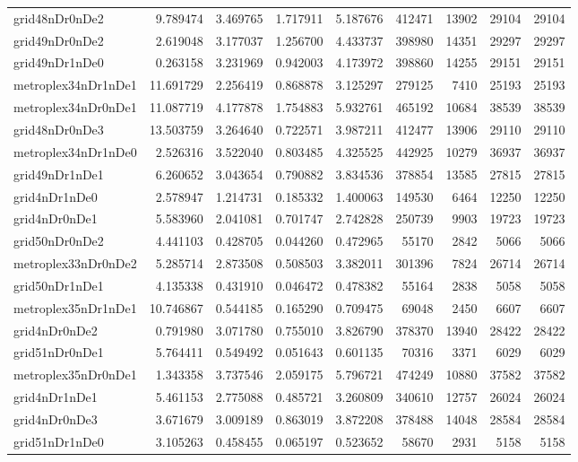\documentclass[../../../thesis.tex]{subfiles}
\begin{document}
\begin{longtable}{|l|r|r|r|r|r|r|r|r|}
grid48nDr0nDe2 & 9.789474 & 3.469765 & 1.717911 & 5.187676 & 412471 & 13902 & 29104 & 29104 \\
grid49nDr0nDe2 & 2.619048 & 3.177037 & 1.256700 & 4.433737 & 398980 & 14351 & 29297 & 29297 \\
grid49nDr1nDe0 & 0.263158 & 3.231969 & 0.942003 & 4.173972 & 398860 & 14255 & 29151 & 29151 \\
metroplex34nDr1nDe1 & 11.691729 & 2.256419 & 0.868878 & 3.125297 & 279125 & 7410 & 25193 & 25193 \\
metroplex34nDr0nDe1 & 11.087719 & 4.177878 & 1.754883 & 5.932761 & 465192 & 10684 & 38539 & 38539 \\
grid48nDr0nDe3 & 13.503759 & 3.264640 & 0.722571 & 3.987211 & 412477 & 13906 & 29110 & 29110 \\
metroplex34nDr1nDe0 & 2.526316 & 3.522040 & 0.803485 & 4.325525 & 442925 & 10279 & 36937 & 36937 \\
grid49nDr1nDe1 & 6.260652 & 3.043654 & 0.790882 & 3.834536 & 378854 & 13585 & 27815 & 27815 \\
grid4nDr1nDe0 & 2.578947 & 1.214731 & 0.185332 & 1.400063 & 149530 & 6464 & 12250 & 12250 \\
grid4nDr0nDe1 & 5.583960 & 2.041081 & 0.701747 & 2.742828 & 250739 & 9903 & 19723 & 19723 \\
grid50nDr0nDe2 & 4.441103 & 0.428705 & 0.044260 & 0.472965 & 55170 & 2842 & 5066 & 5066 \\
metroplex33nDr0nDe2 & 5.285714 & 2.873508 & 0.508503 & 3.382011 & 301396 & 7824 & 26714 & 26714 \\
grid50nDr1nDe1 & 4.135338 & 0.431910 & 0.046472 & 0.478382 & 55164 & 2838 & 5058 & 5058 \\
metroplex35nDr1nDe1 & 10.746867 & 0.544185 & 0.165290 & 0.709475 & 69048 & 2450 & 6607 & 6607 \\
grid4nDr0nDe2 & 0.791980 & 3.071780 & 0.755010 & 3.826790 & 378370 & 13940 & 28422 & 28422 \\
grid51nDr0nDe1 & 5.764411 & 0.549492 & 0.051643 & 0.601135 & 70316 & 3371 & 6029 & 6029 \\
metroplex35nDr0nDe1 & 1.343358 & 3.737546 & 2.059175 & 5.796721 & 474249 & 10880 & 37582 & 37582 \\
grid4nDr1nDe1 & 5.461153 & 2.775088 & 0.485721 & 3.260809 & 340610 & 12757 & 26024 & 26024 \\
grid4nDr0nDe3 & 3.671679 & 3.009189 & 0.863019 & 3.872208 & 378488 & 14048 & 28584 & 28584 \\
grid51nDr1nDe0 & 3.105263 & 0.458455 & 0.065197 & 0.523652 & 58670 & 2931 & 5158 & 5158 \\

\end{longtable}
\end{document}
